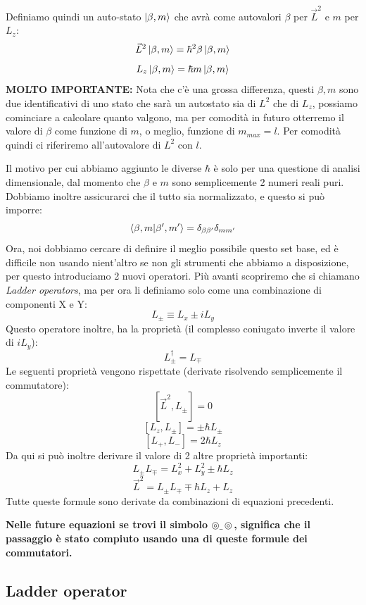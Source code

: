 Definiamo quindi un auto-stato $\ket{\beta, m}$ che avrà come autovalori $\beta$ per $\vec{L}^2$ e $m$ per $L_z$:
$$\vec{L}^2 \ket{\beta, m} = \hbar^2\beta\ket{\beta, m}$$
$$L_z \ket{\beta, m} = \hbar m\ket{\beta, m}$$
\textbf{MOLTO IMPORTANTE:} Nota che c'è una grossa differenza, questi $\beta, m$ sono due identificativi di uno stato che sarà un autostato sia di $L^2$ che di $L_z$, possiamo cominciare a calcolare quanto valgono, ma per comodità in futuro otterremo il valore di $\beta$ come funzione di $m$, o meglio, funzione di $m_{max} = l$. Per comodità quindi ci riferiremo all'autovalore di $L^2$ con $l$.
	
\vspace{15pt}

\noindent Il motivo per cui abbiamo aggiunto le diverse $\hbar$ è solo per una questione di analisi dimensionale, dal momento che $\beta$ e $m$ sono semplicemente 2 numeri reali puri.
Dobbiamo inoltre assicurarci che il tutto sia normalizzato, e questo si può imporre:
$$\braket{\beta, m|\beta', m'} = \delta_{\beta\beta'}\delta_{mm'}$$
Ora, noi dobbiamo cercare di definire il meglio possibile questo set base, ed è difficile non usando nient'altro se non gli strumenti che abbiamo a disposizione, per questo introduciamo 2 nuovi operatori. Più avanti scopriremo che si chiamano \textit{Ladder operators}, ma per ora li definiamo solo come una combinazione di componenti X e Y:
$$L_{\pm} \equiv L_x \pm iL_y$$
Questo operatore inoltre, ha la proprietà (il complesso coniugato inverte il valore di $iL_y$):
$$L_{\pm}^{\dagger} = L_{\mp}$$
Le seguenti proprietà vengono rispettate (derivate risolvendo semplicemente il commutatore):
$$[\vec{L}^2, L_{\pm}] = 0$$
$$[L_z, L_{\pm}] = \pm\hbar L_{\pm}$$
$$[L_+, L_-] = 2\hbar L_z$$
Da qui si può inoltre derivare il valore di 2 altre proprietà importanti:
$$L_{\pm}L_{\mp} = L_x^2+L_y^2\pm\hbar L_z$$
$$\vec{L}^2 = L_{\pm}L_{\mp} \mp \hbar L_z + L_z$$
Tutte queste formule sono derivate da combinazioni di equazioni precedenti. 

\vspace{15pt}

\noindent \textbf{Nelle future equazioni se trovi il simbolo $\circledcirc \_ \circledcirc$, significa che il passaggio è stato compiuto usando una di queste formule dei commutatori.}

\newpage

\subsection{Ladder operator}

